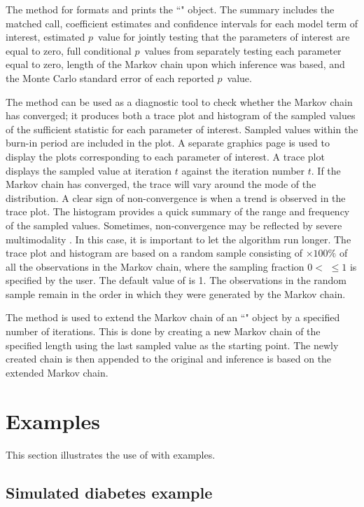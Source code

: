 \documentclass[article, shortnames]{jss}
\begin{document}
The  method for  formats and prints the
``" object. The summary includes the matched call,
coefficient estimates and confidence intervals for each model term
of interest, estimated $p$~value for jointly testing that the
parameters of interest are equal to zero, full conditional
$p$~values from separately testing each parameter equal to zero,
length of the Markov chain upon which inference was based, and the
Monte Carlo standard error of each reported $p$~value.

The  method can be used as a diagnostic tool to check
whether the Markov chain has converged; it produces both a trace
plot and histogram of the sampled values of the sufficient
statistic for each parameter of interest. Sampled values within
the burn-in period are included in the plot. A separate graphics
page is used to display the plots corresponding to each parameter
of interest. A trace plot displays the sampled value at iteration
$t$ against the iteration number $t$. If the Markov chain has
converged, the trace will vary around the mode of the
distribution. A clear sign of non-convergence is when a trend is
observed in the trace plot. The histogram provides a quick summary
of the range and frequency of the sampled values. Sometimes,
non-convergence may be reflected by severe multimodality
\citep{Gilks:1996}. In this case, it is important to let the
algorithm run longer. The trace plot and histogram are based on a
random sample consisting of $\times100\%$ of all the
observations in the Markov chain, where the sampling fraction
$0 <$  $\leq 1$ is specified by the user. The default value of
 is 1. The observations in the random sample remain in the
order in which they were generated by the Markov chain.

The  method is used to extend the Markov chain of
an ``" object by a specified number of iterations. This
is done by creating a new Markov chain of the specified length
using the last sampled value as the starting point. The newly
created chain is then appended to the original and inference is
based on the extended Markov chain.

\section{Examples} \label{Examples}
This section illustrates the use of  with examples.

\subsection{Simulated diabetes example}
\end{document}
